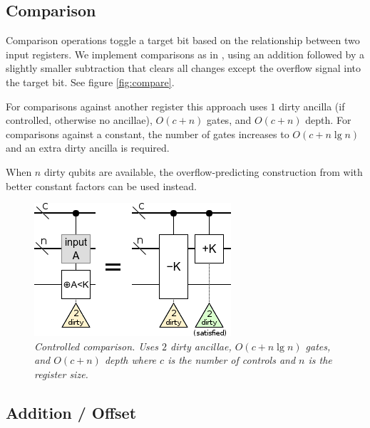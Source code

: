 \documentclass[twocolumn]{article}
\begin{document}
\subsection{Comparison}

Comparison operations toggle a target bit based on the relationship between two input registers.
We implement comparisons as in \cite{takahashi2005}, using an addition followed by a slightly smaller subtraction that clears all changes except the overflow signal into the target bit.
See figure \ref{fig:compare}.

For comparisons against another register this approach uses $1$ dirty ancilla (if controlled, otherwise no ancillae), $O(c + n)$ gates, and $O(c + n)$ depth.
For comparisons against a constant, the number of gates increases to $O(c + n \lg n)$ and an extra dirty ancilla is required.

When $n$ dirty qubits are available, the overflow-predicting construction from \cite{haner2016} with better constant factors can be used instead.


\begin{figure}
  \centering
  \includegraphics[width=\linewidth]{assets/comparison-less-const.png}
  \caption{\em
    Controlled comparison.
    Uses $2$ dirty ancillae, $O(c + n \lg n)$ gates, and $O(c + n)$ depth where $c$ is the number of controls and $n$ is the register size.
  }
  \label{fig:negate-mod}
\end{figure}


\subsection{Addition / Offset}
\end{document}
